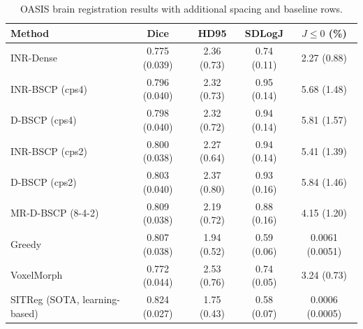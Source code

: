 \begin{table}[t]
\centering
\caption{OASIS brain registration results with additional spacing and baseline rows.}
\label{tab:oasis20-publication-extended}
\begin{tabular}{lcccc}
\toprule
Method & Dice & HD95 & SDLogJ & $J\leq 0$ (\%) \\
\midrule
INR-Dense & 0.775 (0.039) & 2.36 (0.73) & 0.74 (0.11) & 2.27 (0.88) \\
INR-BSCP (cps4) & 0.796 (0.040) & 2.32 (0.73) & 0.95 (0.14) & 5.68 (1.48) \\
D-BSCP (cps4) & 0.798 (0.040) & 2.32 (0.72) & 0.94 (0.14) & 5.81 (1.57) \\
INR-BSCP (cps2) & 0.800 (0.038) & 2.27 (0.64) & 0.94 (0.14) & 5.41 (1.39) \\
D-BSCP (cps2) & 0.803 (0.040) & 2.37 (0.80) & 0.93 (0.16) & 5.84 (1.46) \\
MR-D-BSCP (8-4-2) & 0.809 (0.038) & 2.19 (0.72) & 0.88 (0.16) & 4.15 (1.20) \\
Greedy & 0.807 (0.038) & 1.94 (0.52) & 0.59 (0.06) & 0.0061 (0.0051) \\
VoxelMorph & 0.772 (0.044) & 2.53 (0.76) & 0.74 (0.05) & 3.24 (0.73) \\
SITReg (SOTA, learning-based) & 0.824 (0.027) & 1.75 (0.43) & 0.58 (0.07) & 0.0006 (0.0005) \\
\bottomrule
\end{tabular}
\end{table}
